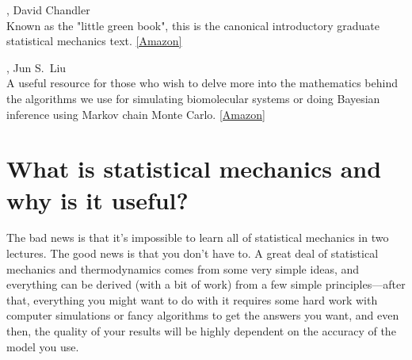 \documentclass[english,course]{lecture}
\begin{document}
, David Chandler \\
Known as the "little green book", this is the canonical introductory graduate statistical mechanics text.
\href{https://www.amazon.com/Introduction-Modern-Statistical-Mechanics-Chandler/dp/0195042778}{[Amazon]}

, Jun S.\ Liu \\
A useful resource for those who wish to delve more into the mathematics behind the algorithms we use for simulating biomolecular systems or doing Bayesian inference using Markov chain Monte Carlo.
\href{https://www.amazon.com/Strategies-Scientific-Computing-Springer-Statistics/dp/0387763694}{[Amazon]}

\vfill
\eject



\section{What is statistical mechanics and why is it useful?}

The bad news is that it's impossible to learn all of statistical mechanics in two lectures.
The good news is that you don't have to.
A great deal of statistical mechanics and thermodynamics comes from some very simple ideas, and everything can be derived (with a bit of work) from a few simple principles---after that, everything you might want to do with it requires some hard work with computer simulations or fancy algorithms to get the answers you want, and even then, the quality of your results will be highly dependent on the accuracy of the model you use.
\end{document}
